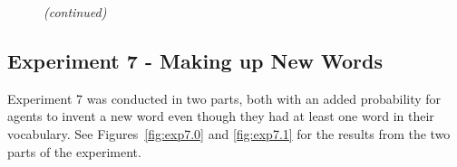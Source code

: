 \begin{figure}[t]\addtocounter{subfigure}{2}
    \centering
    \ContinuedFloat
    \hfill
    \par \bigskip
    \captionsetup{list=no}
    \caption{\emph{(continued)}}
    \label{fig:exp6.1}
\end{figure}

\clearpage
\subsection{Experiment 7 - Making up New Words}
Experiment 7 was conducted in two parts, both with an added probability for agents to invent a new word even though they had at least one word in their vocabulary. See Figures~\ref{fig:exp7.0} and \ref{fig:exp7.1} for the results from the two parts of the experiment.

